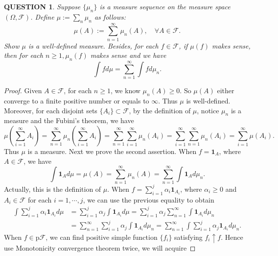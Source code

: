 \documentclass[12pt]{article}
\renewcommand{\i}{\bm{1}}
\renewcommand{\(}{\left(}%
\renewcommand{\)}{\right)}%
\renewcommand{\[}{\left[}%
\renewcommand{\]}{\right]}%
\newcommand{\f}{\mathscr{F}}
\newtheorem{question}{QUESTION}[section]}
\newtheorem{proof}{Proof.}}
\begin{document}
  \begin{question}
   Suppose $\{\mu_n\}$ is a measure sequence on the measure space $(\Omega ,\f )$. Define $\mu:=\sum_n\mu_n$ as follows:
   \begin{equation*}
    \mu(A):=\sum_{n=1}^\infty\mu_n(A),\quad \forall A\in\f.
   \end{equation*}
   Show $\mu$ is a well-defined measure. Besides, for each $f\in\f$, if $\mu(f)$ makes sense, then for each $n\geq 1,\mu_n(f)$ makes sense and we have
   \begin{equation*}
    \int fd\mu=\sum_{n=1}^\infty\int fd\mu_n.
   \end{equation*}
  \end{question}
  \begin{proof}
   Given $A\in\f$, for each $n\geq 1$, we know $\mu_n(A)\geq 0$. So $\mu(A)$ either converge to a finite positive number or equals to $\infty$. Thus $\mu$ is well-defined. Moreover, for each disjoint sets $\{A_i\}\subset\f$, by the definition of $\mu$, notice $\mu_n$ is a measure and the {\sffamily Fubini's theorem}, we have
   \begin{equation*}
    \mu\(\sum_{i=1}^\infty A_i\)=\sum_{n=1}^\infty\mu_n\(\sum_{i=1}^\infty A_i\)=\sum_{n=1}^\infty\sum_{i=1}^\infty\mu_n(A_i)=\sum_{i=1}^\infty\sum_{n=1}^\infty\mu_n(A_i)=\sum_{i=1}^\infty\mu(A_i).
   \end{equation*}
   Thus $\mu$ is a measure. Next we prove the second assertion. When $f=\i_A$, where $A\in\f$, we have
   \begin{equation*}
    \int\i_Ad\mu=\mu(A)=\sum_{n=1}^\infty\mu_n(A)=\sum_{n=1}^\infty\int\i_Ad\mu_n.
   \end{equation*}
   Actually, this is the definition of $\mu$. When $f=\sum_{i=1}^j\alpha_i\i_{A_i}$, where $\alpha_i\geq 0$ and $A_i\in\f$ for each $i=1,\cdots,j$, we can use the previous equality to obtain
   \begin{equation*}
    \begin{split}
     \int\sum_{i=1}^j\alpha_i\i_{A_i}d\mu&=\sum_{i=1}^j\alpha_j\int \i_{A_i}d\mu=\sum_{i=1}^j\alpha_j\sum_{n=1}^\infty\int\i_{A_i}d\mu_n\\
     &=\sum_{n=1}^\infty\sum_{i=1}^j\alpha_j\int\i_{A_i}d\mu_n=\sum_{n=1}^\infty\int\sum_{i=1}^j\alpha_j\i_{A_i}d\mu_n.
    \end{split}
   \end{equation*}
   When $f\in\mathrm{p}\f$, we can find positive simple function $\{f_i\}$ satisfying $f_i\uparrow f$. Hence use {\sffamily Monotonicity convergence theorem} twice, we will acquire

\end{proof}
\end{document}
